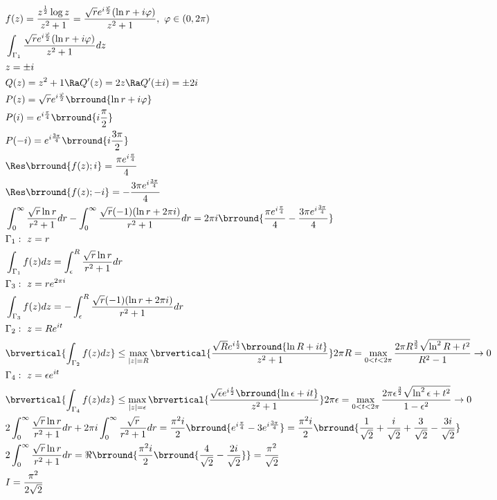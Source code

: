 \begin{align*}
    &f(z)=\frac{z^\frac{1}{2}\log z}{z^2+1}=\frac{\sqrt{r}e^{i\frac{\varphi}{2}}(\ln r+i\varphi)}{z^2+1},\ \varphi\in(0,2\pi)\\
    &\int_{\Gamma_1}\frac{\sqrt{r}e^{i\frac{\varphi}{2}}(\ln r+i\varphi)}{z^2+1}dz\\
    &z=\pm i\\
    &Q(z)=z^2+1\Ra Q'(z)=2z\Ra Q'(\pm i)=\pm 2i\\
    &P(z)=\sqrt{r}e^{i\frac{\varphi}{2}}\brround{\ln r+i\varphi}\\
    &P(i)=e^{i\frac{\pi}{4}}\brround{i\frac{\pi}{2}}\\
    &P(-i)=e^{i\frac{3\pi}{4}}\brround{i\frac{3\pi}{2}}\\
    &\Res\brround{f(z);i}=\frac{\pi e^{i\frac{\pi}{4}}}{4}\\
    &\Res\brround{f(z);-i}=-\frac{3\pi e^{i\frac{3\pi}{4}}}{4}\\
    &\int_0^\infty\frac{\sqrt{r}\ln r}{r^2+1}dr-\int_0^\infty\frac{\sqrt{r}(-1)(\ln r+2\pi i)}{r^2+1}dr=2\pi i\brround{\frac{\pi e^{i\frac{\pi}{4}}}{4}-\frac{3\pi e^{i\frac{3\pi}{4}}}{4}}\\
    &\Gamma_1:\ z=r\\
    &\int_{\Gamma_1}f(z)dz=\int_\epsilon^R\frac{\sqrt{r}\ln r}{r^2+1}dr\\
    &\Gamma_3:\ z=re^{2\pi i}\\
    &\int_{\Gamma_3}f(z)dz=-\int_\epsilon^R\frac{\sqrt{r}(-1)(\ln r+2\pi i)}{r^2+1}dr\\
    &\Gamma_2:\ z=Re^{it}\\
    &\brvertical{\int_{\Gamma_2}f(z)dz}\leq\max_{|z|=R}\brvertical{\frac{\sqrt{R}e^{i\frac{t}{2}}\brround{\ln R+i t}}{z^2+1}}2\pi R=\max_{0< t<2\pi}\frac{2\pi R^\frac{3}{2}\sqrt{\ln^2R+t^2}}{R^2-1}\to0\\
    &\Gamma_4:\ z=\epsilon e^{it}\\
    &\brvertical{\int_{\Gamma_4}f(z)dz}\leq\max_{|z|=\epsilon}\brvertical{\frac{\sqrt{\epsilon}e^{i\frac{t}{2}}\brround{\ln \epsilon+i t}}{z^2+1}}2\pi \epsilon=\max_{0< t<2\pi}\frac{2\pi \epsilon^\frac{3}{2}\sqrt{\ln^2\epsilon+t^2}}{1-\epsilon^2}\to0\\
    &2\int_0^\infty\frac{\sqrt{r}\ln r}{r^2+1}dr+2\pi i\int_0^\infty\frac{\sqrt{r}}{r^2+1}dr=\frac{\pi^2 i}{2}\brround{e^{i\frac{\pi}{4}}-3e^{i\frac{3\pi}{4}}}=\frac{\pi^2 i}{2}\brround{\frac{1}{\sqrt{2}}+\frac{i}{\sqrt{2}}+\frac{3}{\sqrt{2}}-\frac{3i}{\sqrt{2}}}\\
    &2\int_0^\infty\frac{\sqrt{r}\ln r}{r^2+1}dr=\Re\brround{\frac{\pi^2 i}{2}\brround{\frac{4}{\sqrt{2}}-\frac{2i}{\sqrt{2}}}}=\frac{\pi^2}{\sqrt{2}}\\
    &I=\frac{\pi^2}{2\sqrt{2}}
\end{align*}
